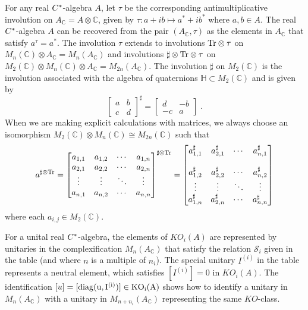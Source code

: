 \documentclass[12pt, reqno]{amsart}
\theoremstyle{definition}
\def\C{{\mathbb C}}
\def\H{{\mathbb H}}
\def\sc{_{\scriptscriptstyle \C}}
\def\diag{\rm{diag}}
\begin{document}
For any real $C \sp *$-algebra $A$, let $\tau$ be the corresponding antimultiplicative involution on $A\sc = A \otimes \C$, given by
$\tau \colon a + ib \mapsto a^* + ib^*$ where $a,b \in A$. The real $C \sp *$-algebra $A$ can be recovered from the pair $(A\sc, \tau)$ as the elements in $A\sc$ that satisfy $a^\tau = a^*$. The involution $\tau$ extends to involutions $\rm{Tr} \otimes \tau$ on $M_n(\C) \otimes A\sc = M_n(A\sc)$ and involutions $\sharp \otimes \rm{Tr} \otimes \tau$ on $M_2(\C) \otimes M_n(\C) \otimes A\sc = M_{2n}(A\sc)$.
The involution $\sharp$ on $M_2(\C)$ is the involution associated with the algebra of quaternions $\H \subset M_2(\C)$ and is given by
$$\begin{bmatrix} a & b \\ c & d \end{bmatrix}^\sharp = \begin{bmatrix} d & -b \\ -c & a \end{bmatrix} \; .$$
When we are making explicit calculations with matrices, we always choose an isomorphism $M_2(\C) \otimes M_n(\C) \cong M_{2n}(\C)$ such that
	$$a^{\sharp \otimes \rm{Tr}}
		= \begin{bmatrix} a_{1,1} & a_{1,2} & \cdots & a_{1,n} \\ a_{2, 1} & a_{2,2} & \cdots & a_{2,n} \\
			\vdots & \vdots & \ddots & \vdots \\ a_{n,1} & a_{n,2} & \cdots & a_{n,n}  \end{bmatrix}^{\sharp \otimes \rm{Tr}} 
	 	= 	\begin{bmatrix} a_{1,1}^{\sharp} & a_{2,1}^\sharp & \cdots & a_{n,1}^\sharp \\
			 \\ a_{1,2}^\sharp & a_{2,2}^\sharp & \cdots & a_{n,2}^\sharp \\
			\vdots & \vdots & \ddots & \vdots \\ a_{1,n}^\sharp & a_{2,n}^\sharp & \cdots & a_{n,n}^\sharp \end{bmatrix}
		$$
where each $a_{i,j} \in M_2(\C)$.
		
For a unital real $C \sp *$-algebra, the elements of $KO_i(A)$ are represented by unitaries in the complexification $M_{n}(A\sc)$ that satisfy the relation $\mathscr{S}_i$ given in the table (and where $n$ is a multiple of $n_i$). The special unitary $I^{(i)}$ in the table represents a neutral element, which satisfies $[ I^{(i)} ] = 0$ in $KO_i(A)$.  The identification $[u] = [\diag(u, I^{(i)})] \in KO_i(A)$ shows how to identify a unitary in $M_n(A\sc)$ with a unitary in $M_{n+n_i}(A\sc)$ representing the same $KO$-class. 
\end{document}
